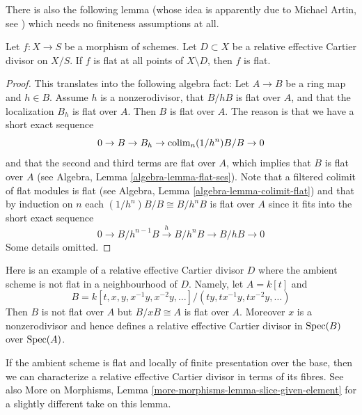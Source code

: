 \noindent
There is also the following lemma (whose idea is apparently
due to Michael Artin, see \cite{Nobile}) which needs no finiteness
assumptions at all.

\begin{lemma}
\label{lemma-michael-artin}
Let $f : X \to S$ be a morphism of schemes.
Let $D \subset X$ be a relative effective Cartier divisor on $X/S$.
If $f$ is flat at all points of $X \setminus D$, then $f$ is flat.
\end{lemma}

\begin{proof}
This translates into the following algebra fact:
Let $A \to B$ be a ring map and $h \in B$.
Assume $h$ is a nonzerodivisor, that $B/hB$ is flat over $A$, and
that the localization $B_h$ is flat over $A$. Then $B$ is flat over $A$.
The reason is that we have a short exact sequence
$$
0 \to B \to B_h \to \mathop{\mathrm{colim}}\nolimits_n (1/h^n)B/B \to 0
$$
and that the second and third terms are flat over $A$, which implies
that $B$ is flat over $A$ (see
Algebra, Lemma \ref{algebra-lemma-flat-ses}). Note that a filtered
colimit of flat modules is flat (see
Algebra, Lemma \ref{algebra-lemma-colimit-flat})
and that by induction on $n$ each $(1/h^n)B/B \cong B/h^nB$ is flat over
$A$ since it fits into the short exact sequence
$$
0 \to B/h^{n - 1}B \xrightarrow{h} B/h^nB \to B/hB \to 0
$$
Some details omitted.
\end{proof}

\begin{example}
\label{example-relative-cartier-ambient-space-not-flat}
Here is an example of a relative effective Cartier divisor $D$ where the
ambient scheme is not flat in a neighbourhood of $D$. Namely, let
$A = k[t]$ and
$$
B = k[t, x, y, x^{-1}y, x^{-2}y, \ldots]/(ty, tx^{-1}y, tx^{-2}y, \ldots)
$$
Then $B$ is not flat over $A$ but $B/xB \cong A$ is flat over $A$.
Moreover $x$ is a nonzerodivisor and hence defines a relative effective
Cartier divisor in $\mathop{\mathrm{Spec}}(B)$ over $\mathop{\mathrm{Spec}}(A)$.
\end{example}

\noindent
If the ambient scheme is flat and locally of finite presentation over
the base, then we can characterize a relative effective Cartier divisor
in terms of its fibres. See also
More on Morphisms, Lemma \ref{more-morphisms-lemma-slice-given-element}
for a slightly different take on this lemma.

